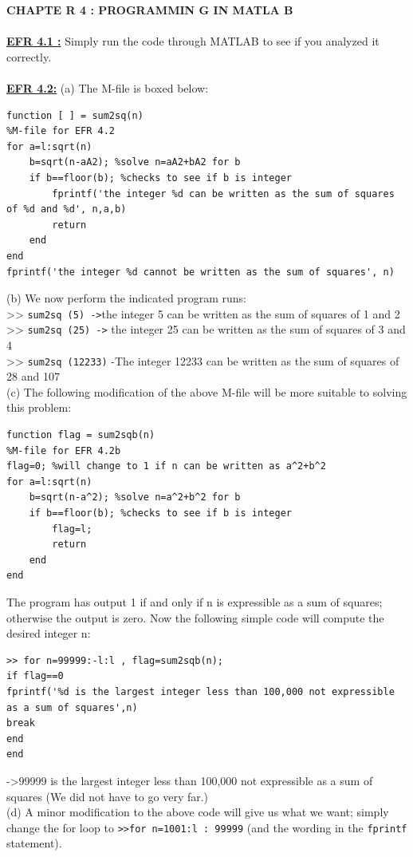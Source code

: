 \documentclass[../main.tex]{subfiles}
\begin{document}
\textbf{CHAPTE R 4 : PROGRAMMIN G IN MATLA B }
\\
\\
\textbf{\underline{EFR 4.1 :}} Simply run the code through MATLAB to see if you analyzed it correctly. 
\\
\\
\textbf{\underline{EFR 4.2:}} (a) The M-file is boxed below:
\begin{lstlisting}[numbers=none]
function [ ] = sum2sq(n) 
%M-file for EFR 4.2 
for a=l:sqrt(n) 
	b=sqrt(n-aA2); %solve n=aA2+bA2 for b 
	if b==floor(b); %checks to see if b is integer 
		fprintf('the integer %d can be written as the sum of squares 
of %d and %d', n,a,b) 
		return 
	end 
end 
fprintf('the integer %d cannot be written as the sum of squares', n) 
\end{lstlisting}
(b) We now perform the indicated program runs:\\ 
>> \texttt{sum2sq (5) ->}the integer 5 can be written as the sum of squares of 1 and 2 \\
>> \texttt{sum2sq (25) ->} the integer 25 can be written as the sum of squares of 3 and 4 \\
>> \texttt{sum2sq (12233)} -The integer 12233 can be written as the sum of squares of 28 and 107 \\
(c) The following modification of the above M-file will be more suitable to solving this problem:
\begin{lstlisting}[numbers=none]
function flag = sum2sqb(n) 
%M-file for EFR 4.2b 
flag=0; %will change to 1 if n can be written as a^2+b^2 
for a=l:sqrt(n) 
	b=sqrt(n-a^2); %solve n=a^2+b^2 for b 
	if b==floor(b); %checks to see if b is integer 
		flag=l; 
		return 
	end 
end 
\end{lstlisting}
The program has output 1 if and only if n is expressible as a sum of squares; otherwise the output is 
zero. Now the following simple code will compute the desired integer n:
\begin{lstlisting}[numbers=none,frame=none]
>> for n=99999:-l:l , flag=sum2sqb(n); 
if flag==0 
fprintf('%d is the largest integer less than 100,000 not expressible 
as a sum of squares',n) 
break 
end 
end 
\end{lstlisting}
->99999 is the largest integer less than 100,000 not expressible as a sum of squares 
(We did not have to go very far.) \\
(d) A minor modification to the above code will give us what we want; simply change the for loop to 
\texttt{>>for n=1001:l : 99999} (and the wording in the \texttt{fprintf} statement).\\
\end{document}
